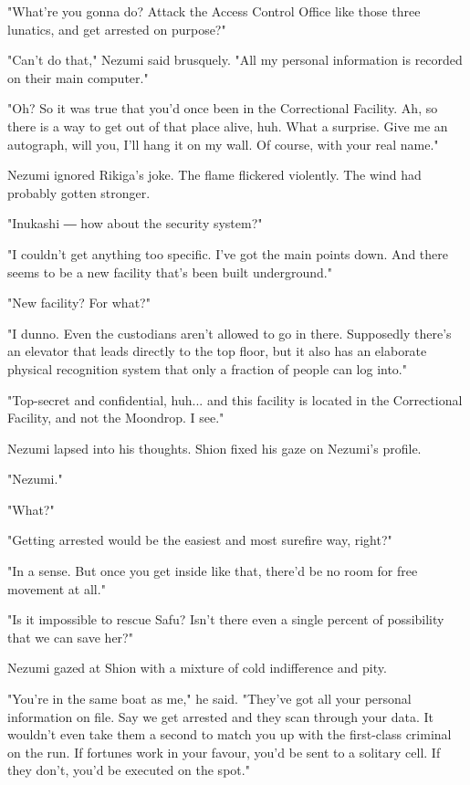 "What're you gonna do? Attack the Access Control Office like those three
lunatics, and get arrested on purpose?"

"Can't do that," Nezumi said brusquely. "All my personal information is
recorded on their main computer."

"Oh? So it was true that you'd once been in the Correctional Facility.
Ah, so there is a way to get out of that place alive, huh. What a
surprise. Give me an autograph, will you, I'll hang it on my wall. Of
course, with your real name."

Nezumi ignored Rikiga's joke. The flame flickered violently. The wind
had probably gotten stronger.

"Inukashi ― how about the security system?"

"I couldn't get anything too specific. I've got the main points down.
And there seems to be a new facility that's been built underground."

"New facility? For what?"

"I dunno. Even the custodians aren't allowed to go in there. Supposedly
there's an elevator that leads directly to the top floor, but it also
has an elaborate physical recognition system that only a fraction of
people can log into."

"Top-secret and confidential, huh... and this facility is located in the
Correctional Facility, and not the Moondrop. I see."

Nezumi lapsed into his thoughts. Shion fixed his gaze on Nezumi's
profile.

"Nezumi."

"What?"

"Getting arrested would be the easiest and most surefire way, right?"

"In a sense. But once you get inside like that, there'd be no room for
free movement at all."

"Is it impossible to rescue Safu? Isn't there even a single percent of
possibility that we can save her?"

Nezumi gazed at Shion with a mixture of cold indifference and pity.

"You're in the same boat as me," he said. "They've got all your personal
information on file. Say we get arrested and they scan through your
data. It wouldn't even take them a second to match you up with the
first-class criminal on the run. If fortunes work in your favour, you'd
be sent to a solitary cell. If they don't, you'd be executed on the
spot."

